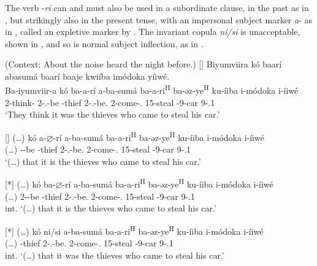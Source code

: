 \documentclass[output=paper]{langscibook}
\begin{document}
The verb -\textit{ri} can and must also be used in a subordinate clause, in the past as in , but strikingly also in the present tense, with an impersonal subject marker \textit{a}- as in , called an expletive marker by \citet{LafkiouiEtAl2016}. The invariant copula \textit{ni/si} is unacceptable, shown in , and so is normal subject inflection, as in .

\ea
\label{bkm:Ref75355595}
(Context: About the noise heard the night before.)
\ea
[]{
Biyumviira kó baarí abasumá baarí baaje kwiíba imódoka yíiwé.\\
\gll
Ba-iyumviir-a  kó  ba-a-rí  a-ba-sumá  ba-a-ri\textsuperscript{H}   ba-əz-ye\textsuperscript{H}  ku-íiba  i-módoka  i-íiwé \\
2\SM{}-think-\FV{}  \COMP{}  2\SM-\N.\PST{}-be  -thief  2\SM-\N.\PST{}-be.\REL{}   2\SM-{}come-\PFV.\REL{}  15-steal  \AUG-{}9-car  9-\POSS.1{} \\
\glt
  ‘They think it was the thieves who came to steal his car.’\\
}

\ex
[]{
\label{bkm:Ref73716709}
\gll
(…)  kó  a-$\varnothing$-rí  a-ba-sumá  ba-a-ri\textsuperscript{H}  ba-əz-ye\textsuperscript{H}   ku-íiba  i-módoka  i-íiwé \\
(…)  \COMP{}  \EXP-\PRS{}-be  -thief  2\SM-\N.\PST{}-be.\REL{}  2\SM-{}come-\PFV.\REL{}   15-steal  \AUG-{}9-car  9-\POSS.1{} \\
\glt
  ‘(…) that it is the thieves who came to steal his car.’\\
}

\ex
[*]{
\label{bkm:Ref75247211}
\gll
(…)  kó  ba-$\varnothing$-rí  a-ba-sumá  ba-a-ri\textsuperscript{H}  ba-əz-ye\textsuperscript{H}   ku-íiba  i-módoka  i-íiwé \\
(…)  \COMP{}  2\SM-\PRS{}-be  -thief  2\SM-\N.\PST{}-be.\REL{}  2\SM-{}come-\PFV.\REL{}   15-steal  \AUG-{}9-car  9-\POSS.1{} \\
\glt
  int. ‘(…) that it is the thieves who came to steal his car.’\\
}

\ex
[*]{
\label{bkm:Ref73716671}
\gll
(…)  kó  ni/si  a-ba-sumá  ba-a-ri\textsuperscript{H}  ba-əz-ye\textsuperscript{H}   ku-íiba  i-módoka  i-íiwé \\
(…)  \COMP{}  \COP{}  -thief  2\SM-\N.\PST{}-be.\REL{}  2\SM-{}come-\PFV.\REL{}   15-steal  \AUG-{}9-car  9-\POSS.1{} \\
\glt
  int. ‘(…) that it was the thieves who came to steal his car.’\\
}
\end{document}
